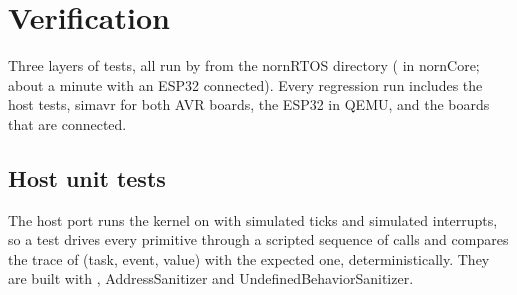 \chapter{Verification}
\label{ch:verify}

Three layers of tests, all run by  from the nornRTOS directory
( in nornCore; about a minute with an ESP32 connected). Every
regression run includes the host tests, simavr for both AVR boards, the ESP32 in QEMU,
and the boards that are connected.

\section{Host unit tests}

The host port runs the kernel on  with simulated ticks and simulated
interrupts, so a test drives every primitive through a scripted sequence of calls and
compares the trace of (task, event, value) with the expected one, deterministically.
They are built with , AddressSanitizer and UndefinedBehaviorSanitizer.

